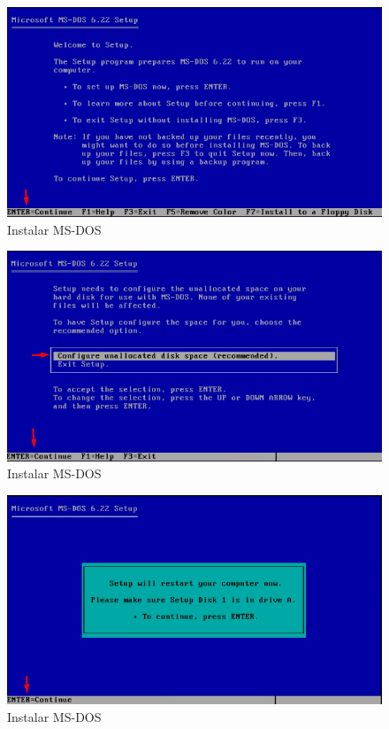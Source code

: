 \documentclass{report}
\begin{document}
\begin{figure}
\centering
\includegraphics[width=\textwidth]{Screenshot_13.png}
\caption{Instalar MS-DOS}
\label{fig:13}
\end{figure}

\begin{figure}
\centering
\includegraphics[width=\textwidth]{Screenshot_14.png}
\caption{Instalar MS-DOS}
\label{fig:14}
\end{figure}

\begin{figure}
\centering
\includegraphics[width=\textwidth]{Screenshot_15.png}
\caption{Instalar MS-DOS}
\label{fig:15}
\end{figure}
\end{document}
